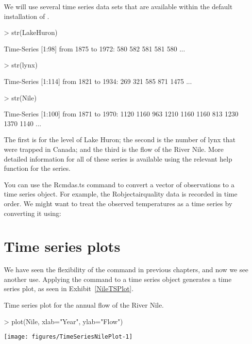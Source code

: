 We will use several time series data sets that are available within the default installation of \R{}.  
\begin{Schunk}
\begin{Sinput}
> str(LakeHuron) 
\end{Sinput}
\begin{Soutput}
 Time-Series [1:98] from 1875 to 1972: 580 582 581 581 580 ...
\end{Soutput}
\begin{Sinput}
> str(lynx) 
\end{Sinput}
\begin{Soutput}
 Time-Series [1:114] from 1821 to 1934: 269 321 585 871 1475 ...
\end{Soutput}
\begin{Sinput}
> str(Nile) 
\end{Sinput}
\begin{Soutput}
 Time-Series [1:100] from 1871 to 1970: 1120 1160 963 1210 1160 1160 813 1230 1370 1140 ...
\end{Soutput}
\end{Schunk}
The first is for the level of Lake Huron; the second is the number of lynx that were trapped in Canada; and the third is the flow of the River Nile. More detailed information for all of these series is available using the relevant help function for the series. 
 
You can use the Rcmd{as.ts} command to convert a vector of observations to a time series object. For example, the Robject{airquality} data is recorded in time order. We might want to treat the observed temperatures as a time series by converting it using: 
\begin{Schunk}
\end{Schunk}
 
\section{Time series plots} 
 
We have seen the flexibility of the  command in previous chapters, and now we see another use. Applying the  command to a time series object generates a time series plot, as seen in Exhibit~\ref{NileTSPlot}. 
\begin{exhibit} 
\begin{center} 
\caption{Time series plot for the annual flow of the River Nile.} 
\label{NileTSPlot} 
\begin{Schunk}
\begin{Sinput}
> plot(Nile, xlab="Year", ylab="Flow") 
\end{Sinput}

\texttt{[image: figures/TimeSeriesNilePlot-1]} \end{Schunk}
\end{center} 
\end{exhibit} 
 
